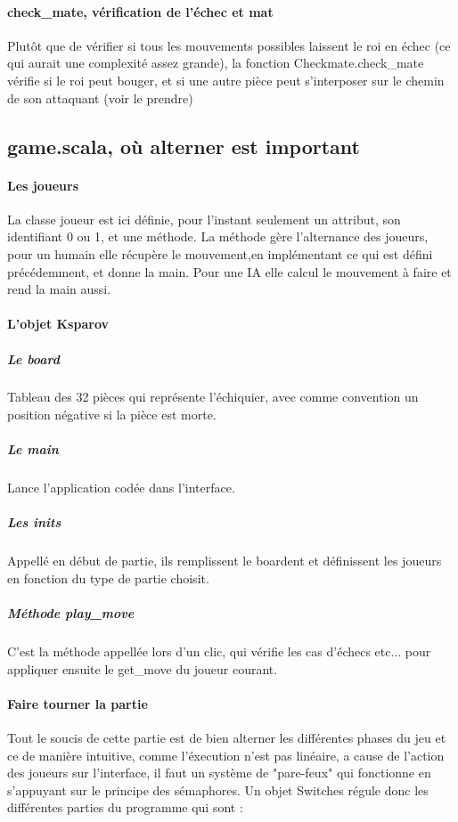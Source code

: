 \documentclass[a4paper]{article}
\begin{document}
\paragraph{check\_mate, vérification de l'échec et mat} Plutôt que de vérifier si tous les mouvements possibles laissent le roi en échec (ce qui aurait une complexité assez grande), la fonction Checkmate.check\_mate vérifie si le roi peut bouger, et si une autre pièce peut s'interposer sur le chemin de son attaquant (voir le prendre)


\subsection{game.scala, où alterner est important}

\paragraph{Les joueurs} La classe joueur est ici définie, pour l'instant seulement un attribut, son identifiant 0 ou 1, et une méthode. La méthode gère l'alternance des joueurs, pour un humain elle récupère le mouvement,en implémentant ce qui est défini précédemment, et donne la main. Pour une IA elle calcul le mouvement à faire et rend la main aussi.

\paragraph{L'objet Ksparov}

\subparagraph{Le board} Tableau des 32 pièces qui représente l'échiquier, avec comme convention un position négative si la pièce est morte.
\subparagraph{Le main} Lance l'application codée dans l'interface.

\subparagraph{Les inits} Appellé en début de partie, ils remplissent le boardent et définissent les joueurs en fonction du type de partie choisit.
\subparagraph{Méthode play\_move} C'est la méthode appellée lors d'un clic, qui vérifie les cas d'échecs etc... pour appliquer ensuite le get\_move du joueur courant.


\paragraph{Faire tourner la partie} Tout le soucis de cette partie est de bien alterner les différentes phases du jeu et ce de manière intuitive, comme l'éxecution n'est pas linéaire, a cause de l'action des joueurs sur l'interface, il faut un système de "pare-feux" qui fonctionne en s'appuyant sur le principe des sémaphores. Un objet Switches régule donc les différentes parties du programme qui sont  : \\
\end{document}
